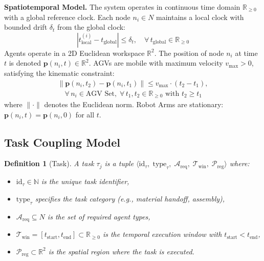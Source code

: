 \documentclass[manuscript,screen,review]{acmart}
\newtheorem{definition}{Definition}
\begin{document}
\textbf{Spatiotemporal Model.}
The system operates in continuous time domain $\mathbb{R}_{\geq 0}$ with a global reference clock. Each node $n_i \in N$ maintains a local clock with bounded drift $\delta_t$ from the global clock:
\[
    |t_{\text{local}}^{(i)} - t_{\text{global}}| \leq \delta_t,
    \quad \forall\, t_{\text{global}} \in \mathbb{R}_{\geq 0}
\]
Agents operate in a 2D Euclidean workspace $\mathbb{R}^2$. The position of node $n_i$ at time $t$ is denoted $\mathbf{p}(n_i, t) \in \mathbb{R}^2$. AGVs are mobile with maximum velocity $v_{\max} > 0$, satisfying the kinematic constraint:
\begin{equation}
\begin{aligned}
\|\mathbf{p}(n_i, t_2) - \mathbf{p}(n_i, t_1)\| \leq
v_{\max} \cdot (t_2 - t_1), \\
\quad \forall\, n_i \in \text{AGV Set},\;
\forall\, t_1, t_2 \in \mathbb{R}_{\geq 0}
\text{ with } t_2 \geq t_1
\end{aligned}
\end{equation}
where $\|\cdot\|$ denotes the Euclidean norm. Robot Arms are stationary: $\mathbf{p}(n_i, t) = \mathbf{p}(n_i, 0)$ for all $t$.

\subsection{Task Coupling Model}
\label{sec:task_model}

\begin{definition}[Task]
\label{def:task}
A task $\tau_j$ is a tuple $\langle \text{id}_\tau,\; \text{type}_\tau,\; \mathcal{A}_{\text{req}},\; \mathcal{T}_{\text{win}},\; \mathcal{P}_{\text{reg}} \rangle$ where:
\begin{itemize}
    \item $\text{id}_\tau \in \mathbb{N}$ is the unique task identifier,
    \item $\text{type}_\tau$ specifies the task category (e.g., material handoff, assembly),
    \item $\mathcal{A}_{\text{req}} \subseteq N$ is the set of required agent types,
    \item $\mathcal{T}_{\text{win}} = [t_{\text{start}}, t_{\text{end}}] \subset \mathbb{R}_{\geq 0}$ is the temporal execution window with $t_{\text{start}} < t_{\text{end}}$,
    \item $\mathcal{P}_{\text{reg}} \subset \mathbb{R}^2$ is the spatial region where the task is executed.
\end{itemize}
\end{definition}
\end{document}
